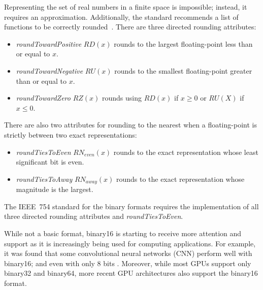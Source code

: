 Representing the set of real numbers in a finite space is impossible; instead, it requires an approximation.
Additionally, the standard recommends a list of functions to be correctly rounded~\cite{ieee754_2008-ev}.
There are three directed rounding attributes:
\begin{itemize}
	\item \textit{roundTowardPositive} $RD(x)$ rounds to the largest floating-point less than or equal to $x$.
	\item \textit{roundTowardNegative} $RU(x)$ rounds to the smallest floating-point greater than or equal to $x$.
	\item \textit{roundTowardZero} $RZ(x)$ rounds using $RD(x)$ if $x \ge 0$ or $RU(X)$ if $x \le 0$.
\end{itemize}
There are also two attributes for rounding to the nearest when a floating-point is strictly between two exact representations:
\begin{itemize}
	\item \textit{roundTiesToEven} $RN_{even}(x)$ rounds to the exact representation whose least significant bit is even.
	\item \textit{roundTiesToAway} $RN_{away}(x)$ rounds to the exact representation whose magnitude is the largest.
\end{itemize}
The IEEE~754 standard for the binary formats requires the implementation of all three directed rounding attributes and \textit{roundTiesToEven}.
						
While not a basic format, binary16 is starting to receive more attention and support as it is increasingly being used for computing applications.
For example, it was found that some convolutional neural networks (CNN) perform well with binary16; and even with only 8 bits .
Moreover, while most GPUs support only binary32 and binary64, more recent GPU architectures also support the binary16 format.
